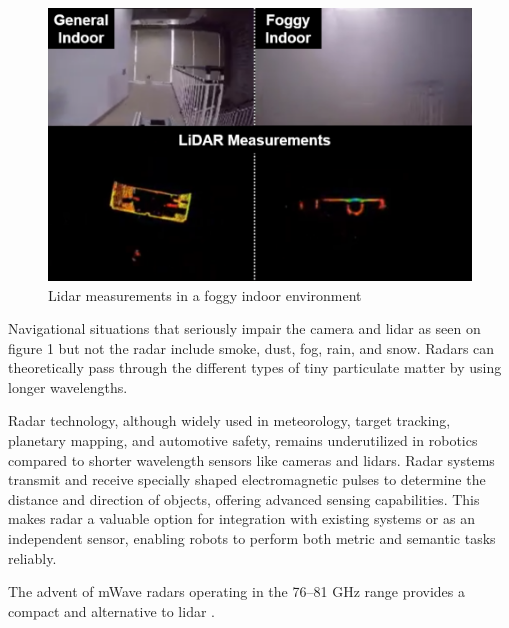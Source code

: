 \begin{figure}[H]
    \centering
    \includegraphics[width=\linewidth]{Src/images/x1.png} 
    \caption{Lidar measurements in a foggy indoor environment \citep{harlow2021mmwave}}
    \label{fig:lidarfogy}
\end{figure}
 
Navigational situations that seriously impair the camera \citep{starr2013navigation} and lidar \citep{radio1943detection} as seen on figure 1 but not the radar include smoke, dust, fog, rain, and snow. Radars can theoretically pass through the different types of tiny particulate matter by using longer wavelengths. 

Radar technology, although widely used in meteorology, target tracking, planetary mapping, and automotive safety, remains underutilized in robotics compared to shorter wavelength sensors like cameras and lidars. Radar systems transmit and receive specially shaped electromagnetic pulses to determine the distance and direction of objects, offering advanced sensing capabilities. This makes radar a valuable option for integration with existing systems or as an independent sensor, enabling robots to perform both metric and semantic tasks reliably.

The advent of mWave radars operating in the 76–81 GHz range provides a compact and alternative to lidar . 

